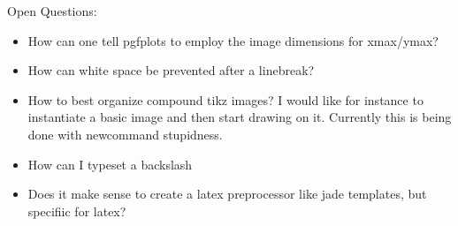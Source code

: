 \documentclass{article}
\begin{document}
    Open Questions:
    \begin{itemize}
        \item How can one tell pgfplots to employ the image dimensions for xmax/ymax?
        \item How can white space be prevented after a linebreak?
        \item How to best organize compound tikz images?
            I would like for instance to instantiate a basic image and then start drawing on it.
            Currently this is being done with newcommand stupidness.
        \item How can I typeset a backslash
        \item Does it make sense to create a latex preprocessor like jade templates, but specifiic for latex?
            
    \end{itemize}

    
\end{document}
